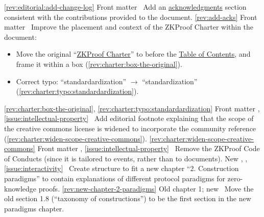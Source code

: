 \newcol \ref{rev:editorial:add-change-log}
\rowendL
Front matter
\newcol 
\newcol {}
\newcol \Chan\ Add an \hyperref[sec:prelim:acknowledgments]{acknowledgments} section consistent with the contributions provided to the document.
\newcol \ref{rev:add-acks}
\rowendL
Front matter
\newcol 
\newcol {}
\newcol \Chan\ Improve the placement and context of the ZKProof Charter within the document:
				\begin{itemize}
				\item Move the original ``\hyperref[sec:prelim:charter]{ZKProof Charter}'' to before the \hyperref[prelim:contents]{Table of Contents}, and frame it within a box (\ref{rev:charter:box-the-original}).
				\item Correct typo: ``standardardization'' $\rightarrow$ ``standardization'' (\ref{rev:charter:typo:standardardization}).
				\end{itemize}
\newcol \ref{rev:charter:box-the-original}, \ref{rev:charter:typo:standardardization}
\rowendL
Front matter
\newcol 
\newcol {}, \ref{issue:intellectual-property}
\newcol \Chan\ Add editorial footnote explaining that the scope of the creative commons license is widened to incorporate the community reference (\ref{rev:charter:widen-scope-creative-commons}).
\newcol \ref{rev:charter:widen-scope-creative-commons}
\rowendL
Front matter
\newcol 
\newcol {}, \ref{issue:intellectual-property}
\newcol \Chan\ Remove the ZKProof Code of Conducts (since it is tailored to events, rather than to documents).
\newcol 
\rowendL
New 
\newcol 
\newcol {}, , \ref{issue:interactivity}
\newcol \Chan\ Create structure to fit a new chapter ``2. Construction paradigms'' to contain explanations 
	of different protocol paradigms for zero-knowledge proofs. 
\newcol \ref{rev:new-chapter-2-paradigms}
\rowendL
Old chapter 1; new 
\newcol 
\newcol {}
\newcol \Chan\ Move the old section 1.8 (``taxonomy of constructions'') 
	to be the first section in the new paradigms chapter.
